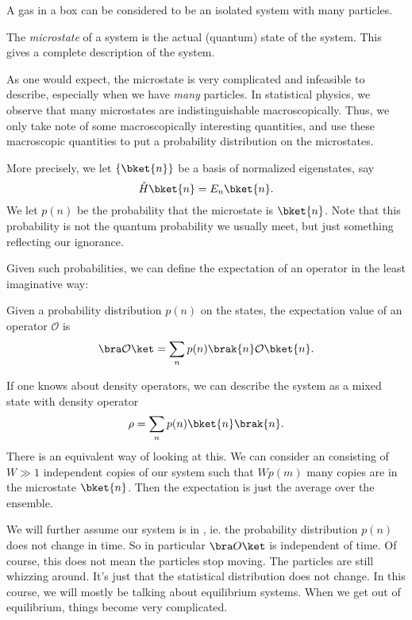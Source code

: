 \documentclass[a4paper]{article}
\begin{document}
\begin{eg}
  A gas in a box can be considered to be an isolated system with many particles.
\end{eg}

\begin{defi}[Microstate]
  The \emph{microstate} of a system is the actual (quantum) state of the system. This gives a complete description of the system.
\end{defi}

As one would expect, the microstate is very complicated and infeasible to describe, especially when we have \emph{many} particles. In statistical physics, we observe that many microstates are indistinguishable macroscopically. Thus, we only take note of some macroscopically interesting quantities, and use these macroscopic quantities to put a probability distribution on the microstates.

More precisely, we let $\{\bket{n}\}$ be a basis of normalized eigenstates, say
\[
  \hat{H}\bket{n} = E_n \bket{n}.
\]
We let $p(n)$ be the probability that the microstate is $\bket{n}$. Note that this probability is not the quantum probability we usually meet, but just something reflecting our ignorance.

Given such probabilities, we can define the expectation of an operator in the least imaginative way:
\begin{defi}
  Given a probability distribution $p(n)$ on the states, the expectation value of an operator $\mathcal{O}$ is
  \[
    \bra \mathcal{O}\ket = \sum_n p(n) \brak{n}\mathcal{O}\bket{n}.
  \]
\end{defi}
If one knows about density operators, we can describe the system as a mixed state with density operator
\[
  \rho = \sum_n p(n) \bket{n}\brak{n}.
\]
There is an equivalent way of looking at this. We can consider an  consisting of $W \gg 1$ independent copies of our system such that $Wp(m)$ many copies are in the microstate $\bket{n}$. Then the expectation is just the average over the ensemble.

We will further assume our system is in , ie. the probability distribution $p(n)$ does not change in time. So in particular $\bra O\ket$ is independent of time. Of course, this does not mean the particles stop moving. The particles are still whizzing around. It's just that the statistical distribution does not change. In this course, we will mostly be talking about equilibrium systems. When we get out of equilibrium, things become very complicated.
\end{document}
